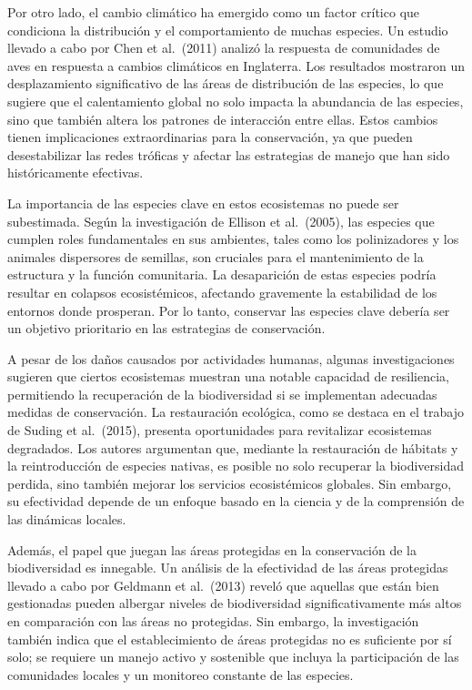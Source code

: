 \documentclass[
  letterpaper,
  DIV=11,
  numbers=noendperiod,
  oneside]{scrreprt}
\begin{document}
Por otro lado, el cambio climático ha emergido como un factor crítico
que condiciona la distribución y el comportamiento de muchas especies.
Un estudio llevado a cabo por Chen et al.~(2011) analizó la respuesta de
comunidades de aves en respuesta a cambios climáticos en Inglaterra. Los
resultados mostraron un desplazamiento significativo de las áreas de
distribución de las especies, lo que sugiere que el calentamiento global
no solo impacta la abundancia de las especies, sino que también altera
los patrones de interacción entre ellas. Estos cambios tienen
implicaciones extraordinarias para la conservación, ya que pueden
desestabilizar las redes tróficas y afectar las estrategias de manejo
que han sido históricamente efectivas.

La importancia de las especies clave en estos ecosistemas no puede ser
subestimada. Según la investigación de Ellison et al.~(2005), las
especies que cumplen roles fundamentales en sus ambientes, tales como
los polinizadores y los animales dispersores de semillas, son cruciales
para el mantenimiento de la estructura y la función comunitaria. La
desaparición de estas especies podría resultar en colapsos
ecosistémicos, afectando gravemente la estabilidad de los entornos donde
prosperan. Por lo tanto, conservar las especies clave debería ser un
objetivo prioritario en las estrategias de conservación.

A pesar de los daños causados por actividades humanas, algunas
investigaciones sugieren que ciertos ecosistemas muestran una notable
capacidad de resiliencia, permitiendo la recuperación de la
biodiversidad si se implementan adecuadas medidas de conservación. La
restauración ecológica, como se destaca en el trabajo de Suding et
al.~(2015), presenta oportunidades para revitalizar ecosistemas
degradados. Los autores argumentan que, mediante la restauración de
hábitats y la reintroducción de especies nativas, es posible no solo
recuperar la biodiversidad perdida, sino también mejorar los servicios
ecosistémicos globales. Sin embargo, su efectividad depende de un
enfoque basado en la ciencia y de la comprensión de las dinámicas
locales.

Además, el papel que juegan las áreas protegidas en la conservación de
la biodiversidad es innegable. Un análisis de la efectividad de las
áreas protegidas llevado a cabo por Geldmann et al.~(2013) reveló que
aquellas que están bien gestionadas pueden albergar niveles de
biodiversidad significativamente más altos en comparación con las áreas
no protegidas. Sin embargo, la investigación también indica que el
establecimiento de áreas protegidas no es suficiente por sí solo; se
requiere un manejo activo y sostenible que incluya la participación de
las comunidades locales y un monitoreo constante de las especies.
\end{document}
